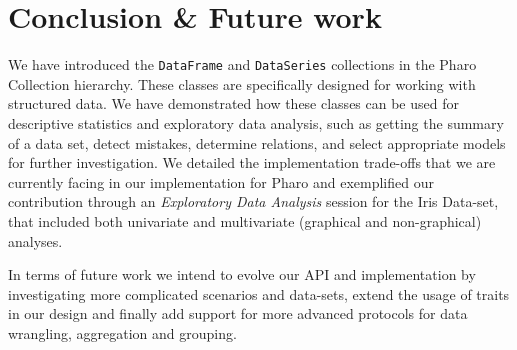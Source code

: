 \documentclass[sigplan]{acmart}
\begin{document}
%

\section{Conclusion \& Future work}
\label{sec:conclusion}
We have introduced the \texttt{DataFrame} and \texttt{DataSeries} collections in the Pharo Collection hierarchy. These classes are specifically designed for working with structured data. We have demonstrated how these classes can be used for descriptive statistics and exploratory data analysis, such as getting the summary of a data set, detect mistakes, determine relations, and select appropriate models for further investigation. We detailed the implementation trade-offs that we are currently facing in our implementation for Pharo and exemplified our contribution through an \textit{Exploratory Data Analysis} session for the Iris Data-set, that included both univariate and multivariate (graphical and non-graphical) analyses. 

In terms of future work we intend to evolve our API and implementation by investigating more complicated scenarios and data-sets, extend the usage of traits in our design and finally add support for more advanced protocols for data wrangling, aggregation and grouping.
%





%
\end{document}
